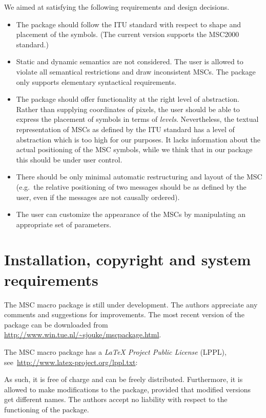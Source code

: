 \documentclass[12pt,a4paper]{article}
\newcommand{\acro}[1]{{#1}}
\newcommand{\MSC}{\acro{MSC}}
\newcommand{\mscpack}{\MSC{} macro package}
\begin{document}
We aimed at satisfying the following requirements and design
decisions.
\begin{itemize}
\item
The package should follow the ITU standard with respect to shape and
placement of the symbols. (The current version supports
the \MSC2000 standard.) 
\item
Static and dynamic semantics are not considered. The user is allowed
to violate all semantical restrictions and draw inconsistent \MSC{}s.
The package only supports elementary syntactical requirements.
\item
The package should offer functionality at the right level of
abstraction. Rather than supplying coordinates of pixels, the
user should be able to express the placement of symbols in terms of
{\em levels}.
Nevertheless, the textual representation of \MSC{}s as defined by the ITU
standard has a level of abstraction which is too high for our purposes.
It lacks information about the actual positioning of the \MSC{} symbols,
while we think that in our package this should be under user control.
\item
There should be only minimal automatic restructuring and layout of the
\MSC{} (e.g.\ the relative positioning of two messages should be as
defined by the user, even if the messages are not causally ordered).
\item
The user can customize the appearance of the \MSC{}s by manipulating
an appropriate set of parameters.
\end{itemize}

\section{Installation, copyright and system requirements}
\label{install}

The \mscpack{} is still under development. The authors
appreciate any comments and suggestions for improvements. The most
recent version of the package can be downloaded from
\url{http://www.win.tue.nl/~sjouke/mscpackage.html}.


The \mscpack{} has a \emph{LaTeX Project Public License}
(LPPL), see~\url{http://www.latex-project.org/lppl.txt}:
{\small

} As such, it is free of charge and can be freely
distributed. Furthermore, it is allowed to make modifications to the
package, provided that modified versions get different names.  The
authors accept no liability with respect to the functioning of the
package.
\end{document}
